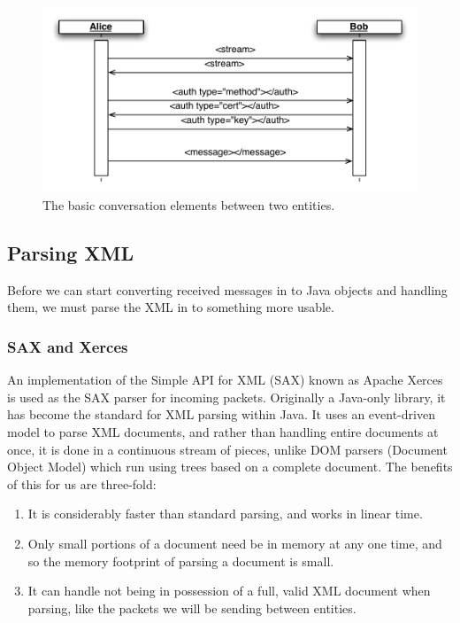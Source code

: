     \begin{figure}
      \centering
      \includegraphics[scale=0.7]{./Figures/Ch6/6-4-3-1.pdf}
      \caption{The basic conversation elements between two entities.}
      \label{fig:conv_overview}
    \end{figure}
    
  \subsection{Parsing XML}
  
  Before we can start converting received messages in to Java objects and handling them, we must parse the XML in to something more usable.
  
    \subsubsection{SAX and Xerces}
    \label{subsubsec:sax}
    
    An implementation of the Simple API for XML (SAX) known as Apache Xerces is used as the SAX parser for incoming packets. Originally a Java-only library, it has become the standard for XML parsing within Java. It uses an event-driven model to parse XML documents, and rather than handling entire documents at once, it is done in a continuous stream of pieces, unlike DOM parsers (Document Object Model) which run using trees based on a complete document. The benefits of this for us are three-fold:
    
    \begin{enumerate}
      \item It is considerably faster than standard parsing, and works in linear time.
      \item Only small portions of a document need be in memory at any one time, and so the memory footprint of parsing a document is small.
      \item It can handle not being in possession of a full, valid XML document  when parsing, like the packets we will be sending between entities.
    \end{enumerate}
    
